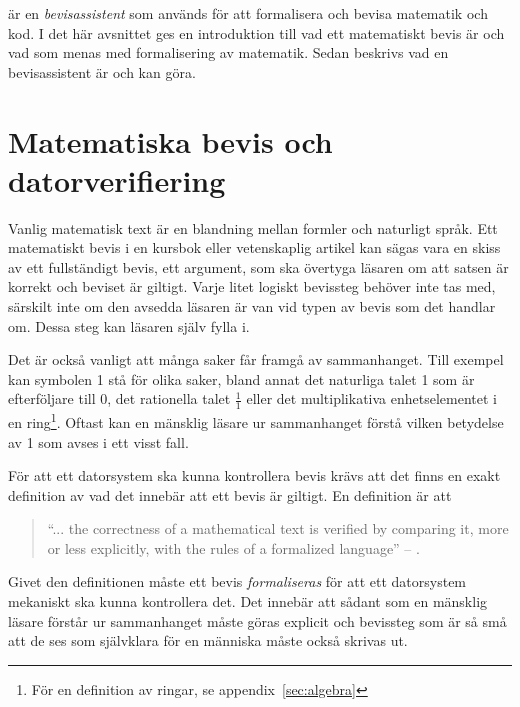 \coq{} är en \emph{bevisassistent} som används för att formalisera och bevisa
matematik och kod.
I det här avsnittet ges en introduktion till vad ett matematiskt bevis är och
vad som menas med formalisering av matematik. Sedan beskrivs vad en
bevisassistent är och kan göra.

\section{Matematiska bevis och datorverifiering}
Vanlig matematisk text är en blandning mellan formler och naturligt språk. Ett
matematiskt bevis i en kursbok eller vetenskaplig artikel kan sägas vara en
skiss av ett fullständigt bevis, ett argument, som ska övertyga läsaren om att
satsen är korrekt och beviset är giltigt. Varje litet logiskt bevissteg behöver
inte tas med, särskilt inte om den avsedda läsaren är van vid typen av bevis
som det handlar om. Dessa steg kan läsaren själv fylla i.


Det är också vanligt att många saker får framgå av sammanhanget.
Till exempel kan symbolen 1 stå för olika saker, bland annat det naturliga
talet 1 som är efterföljare till 0, det rationella talet $\frac{1}{1}$ eller
det multiplikativa enhetselementet i en ring\footnote{För en definition av
ringar, se appendix~\ref{sec:algebra}}. Oftast kan en mänsklig läsare ur
sammanhanget förstå vilken betydelse av 1 som avses i ett visst fall.

För att ett datorsystem ska kunna kontrollera bevis krävs att det finns en
exakt definition av vad det innebär att ett bevis är giltigt. En definition är
att
\begin{quote}
``... the correctness of a mathematical text is verified by comparing it, more or
less explicitly, with the rules of a formalized language'' -- \cite{bourbaki1968sets}.
\end{quote}

Givet den definitionen måste ett bevis \emph{formaliseras} för att ett
datorsystem mekaniskt ska kunna kontrollera det. Det innebär att sådant som en
mänsklig läsare förstår ur sammanhanget måste göras explicit och bevissteg som
är så små att de ses som självklara för en människa måste också skrivas ut.

